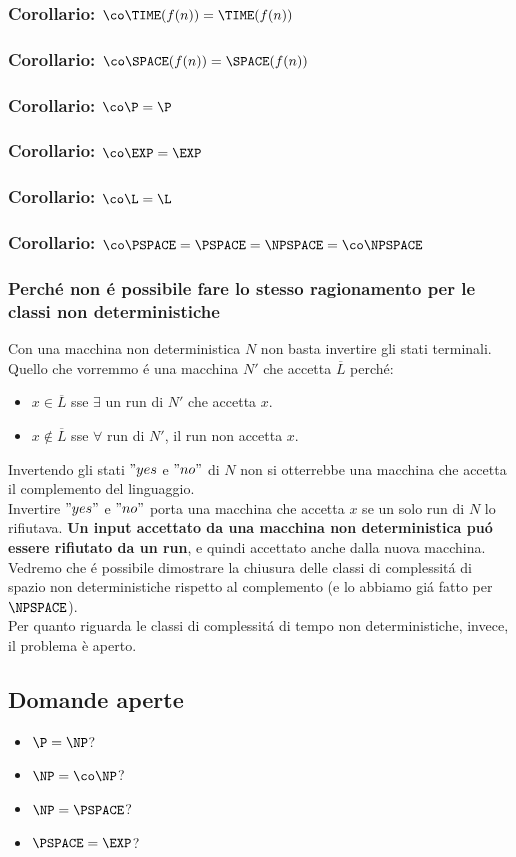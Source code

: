 \subsubsection{Corollario: $\co \TIME(f(n)) = \TIME(f(n))$}
\subsubsection{Corollario: $\co \SPACE(f(n)) = \SPACE(f(n))$}
\subsubsection{Corollario: $\co \P = \P$}
\subsubsection{Corollario: $\co \EXP = \EXP$}
\subsubsection{Corollario: $\co \L = \L$}
\subsubsection{Corollario: $\co \PSPACE = \PSPACE = \NPSPACE = \co \NPSPACE$}
\subsubsection{Perché non é possibile fare lo stesso ragionamento per le classi non deterministiche}
Con una macchina non deterministica $N$ non basta invertire gli stati terminali. \\
Quello che vorremmo é una macchina $N'$ che accetta $\overline{L}$ perché:
\begin{itemize}
\item $x \in \overline{L}$ sse $\exists$ un run di $N'$ che accetta $x$.
\item $x \notin \overline{L}$ sse $\forall$ run di $N'$, il run non accetta $x$.
\end{itemize}
Invertendo gli stati $"yes$ e $"no"$ di $N$ non si otterrebbe una macchina che accetta il complemento del linguaggio. \\ 
Invertire $"yes"$ e $"no"$ porta una macchina che accetta $x$ se un solo run di $N$ lo rifiutava. 
\textbf{Un input accettato da una macchina non deterministica puó essere rifiutato da un run}, e quindi accettato anche dalla nuova macchina. \\

Vedremo che é possibile dimostrare la chiusura delle classi di complessitá di spazio non deterministiche rispetto al complemento
(e lo abbiamo giá fatto per $\NPSPACE$). \\
Per quanto riguarda le classi di complessitá di tempo non deterministiche, invece, il problema è aperto.


\subsection{Domande aperte}
\begin{itemize}
    \item $\P = \NP$?
    \item $\NP = \co\NP$?
    \item $\NP = \PSPACE$?
    \item $\PSPACE = \EXP$?
\end{itemize}
